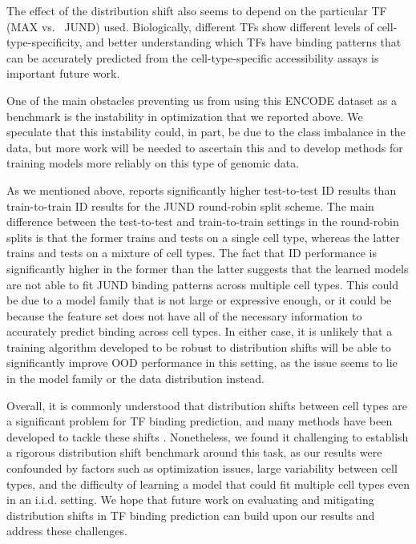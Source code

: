The effect of the distribution shift also seems to depend on the particular TF (MAX vs.~ JUND) used.
Biologically, different TFs show different levels of cell-type-specificity, and better understanding which TFs have binding patterns that can be accurately predicted from the cell-type-specific accessibility assays is important future work.

One of the main obstacles preventing us from using this ENCODE dataset as a \Wilds benchmark is the instability in optimization that we reported above.
We speculate that this instability could, in part, be due to the class imbalance in the data, but more work will be needed to ascertain this and to develop methods for training models more reliably on this type of genomic data.

As we mentioned above,  reports significantly higher test-to-test ID results than train-to-train ID results for the JUND round-robin split scheme. The main difference between the test-to-test and train-to-train settings in the round-robin splits is that the former trains and tests on a single cell type, whereas the latter trains and tests on a mixture of cell types. The fact that ID performance is significantly higher in the former than the latter suggests that the learned models are not able to fit JUND binding patterns across multiple cell types.
This could be due to a model family that is not large or expressive enough, or it could be because the feature set does not have all of the necessary information to accurately predict binding across cell types.
In either case, it is unlikely that a training algorithm developed to be robust to distribution shifts will be able to significantly improve OOD performance in this setting, as the issue seems to lie in the model family or the data distribution instead.

Overall, it is commonly understood that distribution shifts between cell types are a significant problem for TF binding prediction, and many methods have been developed to tackle these shifts \citep{EDneurips17, li2019anchor, li2019leopard, keilwagen2019accurate, quang2019factornet}.
Nonetheless, we found it challenging to establish a rigorous distribution shift benchmark around this task,
as our results were confounded by factors such as optimization issues, large variability between cell types,
and the difficulty of learning a model that could fit multiple cell types even in an i.i.d. setting.
We hope that future work on evaluating and mitigating distribution shifts in TF binding prediction
can build upon our results and address these challenges.


